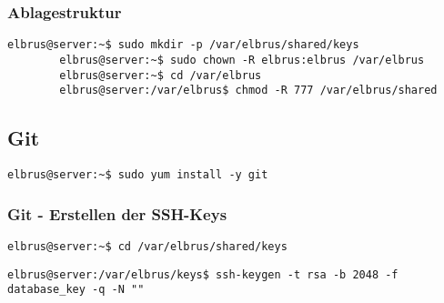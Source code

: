 \documentclass{article}
\begin{document}
	\subsubsection{Ablagestruktur}
	
	\lstset{style=commands}
	\begin{lstlisting}[caption={Anlegen der Verzeichnissstruktur.}]
		elbrus@server:~$ sudo mkdir -p /var/elbrus/shared/keys
		elbrus@server:~$ sudo chown -R elbrus:elbrus /var/elbrus
		elbrus@server:~$ cd /var/elbrus
		elbrus@server:/var/elbrus$ chmod -R 777 /var/elbrus/shared
	\end{lstlisting}
	\newpage

	\subsection{Git}
	
	\lstset{style=commands}
	\begin{lstlisting}[caption={Installieren von dem VCS 'git'.}]
		elbrus@server:~$ sudo yum install -y git
	\end{lstlisting}
	
	\lstset{style=commands}
	\subsubsection{Git - Erstellen der SSH-Keys}
	\begin{lstlisting}[caption={Wechseln des Verzeichnisses.}]
		elbrus@server:~$ cd /var/elbrus/shared/keys
	\end{lstlisting}
	
	\lstset{style=commands}
	\begin{lstlisting}[caption={Erstellen des SSH-keys der für das Herunterladen der 'Database' benötigt wird.}]
		elbrus@server:/var/elbrus/keys$ ssh-keygen -t rsa -b 2048 -f database_key -q -N ""
	\end{lstlisting}


\end{document}

